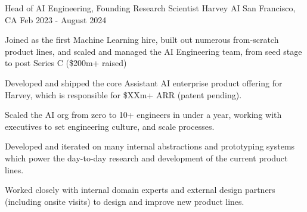 
\begin{cventries}

  \cventry
  {Head of AI Engineering, Founding Research Scientist}
  {Harvey AI}
  {San Francisco, CA}
  {Feb 2023 - August 2024}
  {
    \begin{cvitems}
      \item Joined as the first Machine Learning hire, built out numerous from-scratch product lines, and scaled and managed the AI Engineering team,
	  	from seed stage to post Series C (\$200m+ raised)
      \item Developed and shipped the core Assistant AI enterprise product offering for Harvey, which is responsible for \$XXm+ ARR (patent pending).
      \item Scaled the AI org from zero to 10+ engineers in under a year, working with executives to set engineering culture, and scale processes.
      \item Developed and iterated on many internal abstractions and prototyping systems which power the day-to-day research
      	and development of the current product lines.
      \item Worked closely with internal domain experts and external design partners (including onsite visits) to design and
      	improve new product lines.
    \end{cvitems}
  }


\end{cventries}
